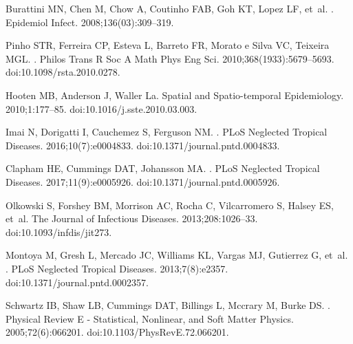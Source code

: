 \documentclass[10pt,letterpaper]{article}
\begin{document}
\begin{thebibliography}{10}
Burattini MN, Chen M, Chow A, Coutinho FAB, Goh KT, Lopez LF, et~al.
.
\newblock Epidemiol Infect. 2008;136(03):309--319.

Pinho STR, Ferreira CP, Esteva L, Barreto FR, {Morato e Silva} VC, Teixeira
  MGL.
.
\newblock Philos Trans R Soc A Math Phys Eng Sci. 2010;368(1933):5679--5693.
\newblock doi:{10.1098/rsta.2010.0278}.

Hooten MB, Anderson J, Waller La.
\newblock Spatial and Spatio-temporal Epidemiology. 2010;1:177--85.
\newblock doi:{10.1016/j.sste.2010.03.003}.

Imai N, Dorigatti I, Cauchemez S, Ferguson NM.
.
\newblock PLoS Neglected Tropical Diseases. 2016;10(7):e0004833.
\newblock doi:{10.1371/journal.pntd.0004833}.

Clapham HE, Cummings DAT, Johansson MA.
.
\newblock PLoS Neglected Tropical Diseases. 2017;11(9):e0005926.
\newblock doi:{10.1371/journal.pntd.0005926}.

Olkowski S, Forshey BM, Morrison AC, Rocha C, Vilcarromero S, Halsey ES, et~al.
\newblock The Journal of Infectious Diseases. 2013;208:1026--33.
\newblock doi:{10.1093/infdis/jit273}.

Montoya M, Gresh L, Mercado JC, Williams KL, Vargas MJ, Gutierrez G, et~al.
.
\newblock PLoS Neglected Tropical Diseases. 2013;7(8):e2357.
\newblock doi:{10.1371/journal.pntd.0002357}.

Schwartz IB, Shaw LB, Cummings DAT, Billings L, Mccrary M, Burke DS.
.
\newblock Physical Review E - Statistical, Nonlinear, and Soft Matter Physics.
  2005;72(6):066201.
\newblock doi:{10.1103/PhysRevE.72.066201}.


\end{thebibliography}
\end{document}
